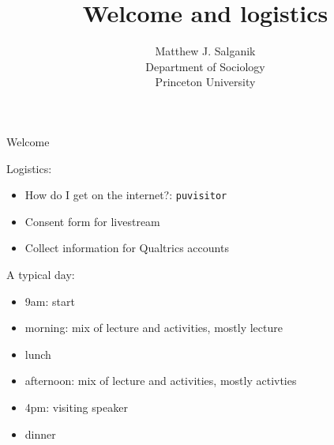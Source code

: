 \documentclass{beamer}
\title[]{Welcome and logistics}
\author[]{Matthew J. Salganik\\Department of Sociology\\Princeton University}
\date[]{Summer Institute in Computational Social Science\\June 19, 2017
\vfill
\begin{flushright}
\vspace{0.6in}
\texttt{[image: figures/cc-by.png]}
\end{flushright}
}
\begin{document}
\frame{\titlepage}
\begin{frame}

\begin{center}
\Large{Welcome}
\end{center}

\end{frame}
\begin{frame}

Logistics:
\pause
\begin{itemize}
\item How do I get on the internet?: \texttt{puvisitor}
\pause
\item Consent form for livestream
\pause
\item Collect information for Qualtrics accounts
\end{itemize}

\end{frame}
\begin{frame}

A typical day:
\begin{itemize}
\item 9am: start
\item morning: mix of lecture and activities, mostly lecture
\item lunch
\item afternoon: mix of lecture and activities, mostly activties
\item 4pm: visiting speaker
\item dinner
\end{itemize}

\end{frame}
\end{document}
